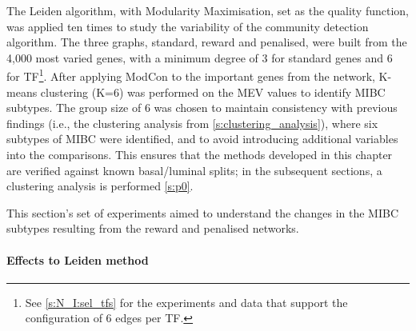 The Leiden algorithm, with Modularity Maximisation, set as the quality function, was applied ten times to study the variability of the community detection algorithm. The three graphs, standard, reward and penalised, were built from the 4,000 most varied genes, with a minimum degree of 3 for standard genes and 6 for TF\footnote{See \cref{s:N_I:sel_tfs} for the experiments and data that support the configuration of 6 edges per TF.}. After applying ModCon to the important genes from the network, K-means clustering (K=6) was performed on the MEV values to identify MIBC subtypes. The group size of 6 was chosen to maintain consistency with previous findings (i.e., the clustering analysis from \cref{s:clustering_analysis}), where six subtypes of MIBC were identified, and to avoid introducing additional variables into the comparisons. This ensures that the methods developed in this chapter are verified against known basal/luminal splits; in the subsequent sections, a clustering analysis is performed \cref{s:p0}. 

This section's set of experiments aimed to understand the changes in the MIBC subtypes resulting from the reward and penalised networks.




\paragraph*{Effects to Leiden method}


